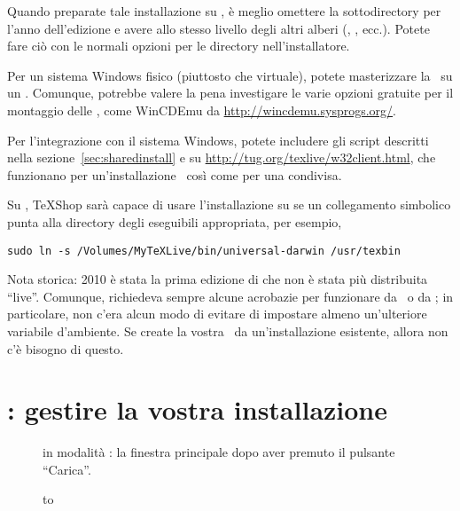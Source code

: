 \documentclass{article}
\begin{document}
Quando preparate tale installazione su \ISO, è meglio omettere la
sottodirectory per l'anno dell'edizione e avere  allo
stesso livello degli altri alberi (,
, ecc.). Potete fare ciò con le normali opzioni per le
directory nell'installatore.

Per un sistema Windows fisico (piuttosto che virtuale), potete masterizzare
la \ISO\ su un . Comunque, potrebbe valere la pena investigare le
varie opzioni gratuite per il montaggio delle \ISO, come WinCDEmu da
\url{http://wincdemu.sysprogs.org/}.

Per l'integrazione con il sistema Windows, potete includere gli script
 descritti nella sezione~\ref{sec:sharedinstall} e su
\url{http://tug.org/texlive/w32client.html}, che funzionano per
un'installazione \ISO\ così come per una condivisa.

Su \MacOSX, TeXShop sarà capace di usare l'installazione su
 se un collegamento simbolico  punta alla
directory degli eseguibili appropriata, per esempio,
\begin{verbatim}
sudo ln -s /Volumes/MyTeXLive/bin/universal-darwin /usr/texbin
\end{verbatim}

Nota storica: \TL{} 2010 è stata la prima edizione di \TL{} che non è stata
più distribuita ``live''. Comunque, richiedeva sempre alcune acrobazie per
funzionare da \DVD\ o da \ISO; in particolare, non c'era alcun modo di
evitare di impostare almeno un'ulteriore variabile d'ambiente. Se create la
vostra \ISO\ da un'installazione esistente, allora non c'è bisogno di
questo.


\section{: gestire la vostra installazione}
\label{sec:tlmgr}

\begin{figure}[tb]
\caption{ in modalità \GUI: la finestra principale dopo aver
  premuto il pulsante ``Carica''.}\label{fig:tlmgr-gui}
\end{figure}

\begin{figure}[tb]
\hbox to 
\end{figure}
\end{document}
